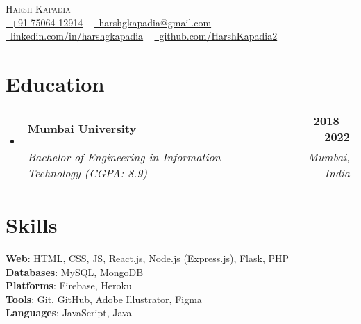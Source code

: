 \documentclass[letterpaper,11pt]{article}
\makeatletter
\newcommand{\resumeSubheading}[4]{
  \vspace{-2pt}\item
    \begin{tabular*}{1.0\textwidth}[t]{l@{\extracolsep{\fill}}r}
      \textbf{#1} & \textbf{\small #2} \\
      \textit{\small#3} & \textit{\small #4} \\
    \end{tabular*}\vspace{-7pt}
}
\newcommand{\resumeSubHeadingListStart}{\begin{itemize}[leftmargin=0.0in, label={}]}
\newcommand{\resumeSubHeadingListEnd}{\end{itemize}}
\makeatother
\begin{document}

\begin{center}
    {\Huge \scshape Harsh Kapadia} \\ \vspace{2pt}
    \small
    \faPhone \href{mailto:harshgkapadia@gmail.com}{\raisebox{-0.1\height}\ +91 75064 12914} ~ \faEnvelope \href{mailto:harshgkapadia@gmail.com}{\raisebox{-0.2\height}\  harshgkapadia@gmail.com} ~ 
    \faLinkedin \href{https://linkedin.com/in/harshgkapadia/}{\raisebox{-0.2\height}\ linkedin.com/in/harshgkapadia} ~
    \faGithub \href{https://github.com/HarshKapadia2}{\raisebox{-0.2\height}\ github.com/HarshKapadia2}
    \vspace{-8pt}
\end{center}


\section{Education}
  \resumeSubHeadingListStart
    \resumeSubheading
        {Mumbai University}{2018 -- 2022}
        {Bachelor of Engineering in Information Technology (CGPA: 8.9)}{Mumbai, India}
    \resumeSubHeadingListEnd


\section{Skills}
    \begin{itemize}[leftmargin=0.2in, label={}]
    {\item{
        \textbf{Web}: HTML, CSS, JS, React.js, Node.js (Express.js), Flask, PHP \\
        \textbf{Databases}: MySQL, MongoDB \\
        \textbf{Platforms}: Firebase, Heroku \\
        \textbf{Tools}: Git, GitHub, Adobe Illustrator, Figma \\
        \textbf{Languages}: JavaScript, Java
    }}
    \end{itemize}
\vspace{-16pt}
\end{document}
